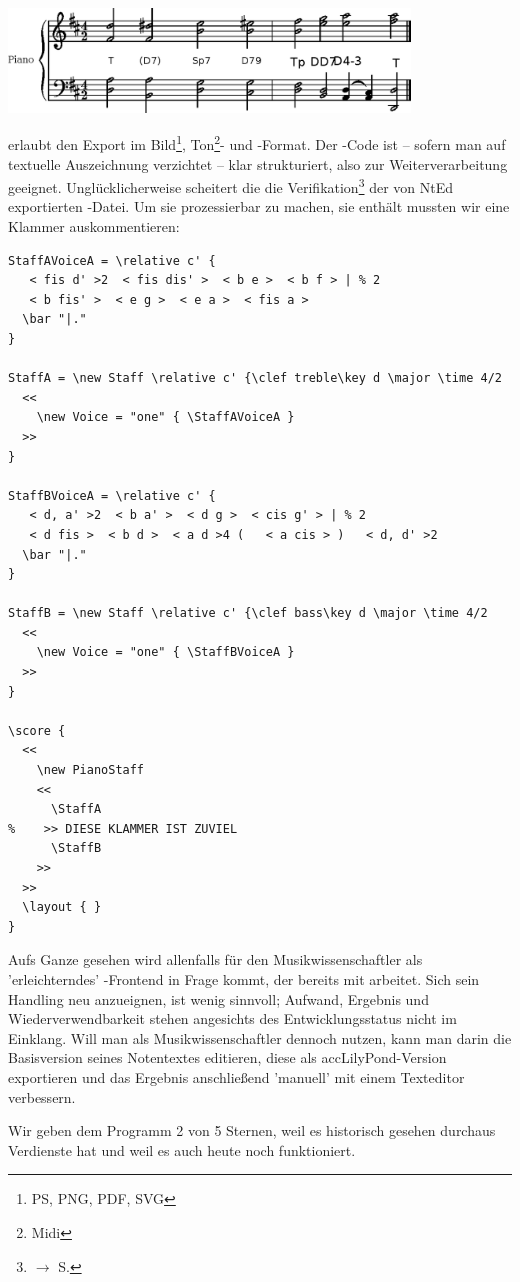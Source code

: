 \begin{center}
\includegraphics[width=0.8\textwidth]{frontends/nted/candenca2-ntd}
\end{center}

 erlaubt den Export im Bild\footnote{PS, PNG, PDF, SVG},
Ton\footnote{Midi}- und -Format. Der -Code ist --
sofern man auf textuelle Auszeichnung verzichtet -- klar strukturiert, also zur
Weiterverarbeitung geeignet. Unglücklicherweise scheitert die die
Verifikation\footnote{$\rightarrow$ S.\pageref{ExportVerifikation}} der von NtEd
exportierten -Datei. Um sie prozessierbar zu machen, sie enthält
mussten wir eine Klammer auskommentieren:

\begin{verbatim}
StaffAVoiceA = \relative c' {
   < fis d' >2  < fis dis' >  < b e >  < b f > | % 2
   < b fis' >  < e g >  < e a >  < fis a > 
  \bar "|."
}

StaffA = \new Staff \relative c' {\clef treble\key d \major \time 4/2
  <<
    \new Voice = "one" { \StaffAVoiceA } 
  >>
}

StaffBVoiceA = \relative c' {
   < d, a' >2  < b a' >  < d g >  < cis g' > | % 2
   < d fis >  < b d >  < a d >4 (   < a cis > )   < d, d' >2 
  \bar "|."
}

StaffB = \new Staff \relative c' {\clef bass\key d \major \time 4/2
  <<
    \new Voice = "one" { \StaffBVoiceA } 
  >>
}

\score {
  <<
    \new PianoStaff 
    <<
      \StaffA
%    >> DIESE KLAMMER IST ZUVIEL
      \StaffB
    >>
  >>
  \layout { }
}
\end{verbatim}

Aufs Ganze gesehen wird  allenfalls für den Musikwissenschaftler als
'erleichterndes' -Frontend in Frage kommt, der bereits mit
 arbeitet. Sich sein Handling neu anzueignen, ist wenig sinnvoll;
Aufwand, Ergebnis und Wiederverwendbarkeit stehen angesichts des
Entwicklungsstatus nicht im Einklang. Will man als Musikwissenschaftler
 dennoch nutzen, kann man darin die Basisversion seines Notentextes
editieren, diese als acc{LilyPond}-Version exportieren und das Ergebnis
anschließend 'manuell' mit einem Texteditor verbessern.

Wir geben dem Programm 2 von 5 Sternen, weil es historisch gesehen durchaus
Verdienste hat und weil es auch heute noch funktioniert.


%
